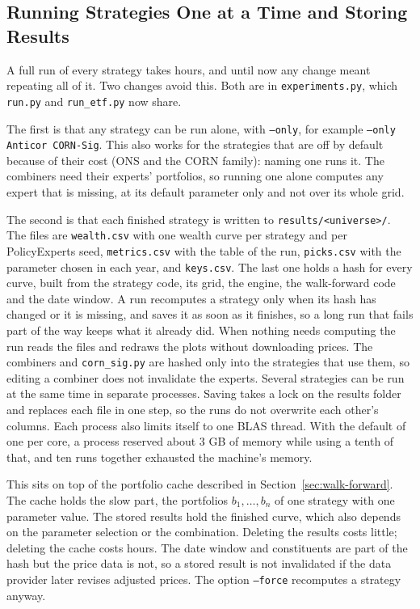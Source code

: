 \documentclass[11pt]{article}
\begin{document}
\subsection{Running Strategies One at a Time and Storing Results}
\label{sec:storing}

A full run of every strategy takes hours, and until now any change meant
repeating all of it. Two changes avoid this. Both are in
\texttt{experiments.py}, which \texttt{run.py} and \texttt{run\_etf.py}
now share.

The first is that any strategy can be run alone, with
\texttt{--only}, for example \texttt{--only Anticor CORN-Sig}. This also
works for the strategies that are off by default because of their cost
(ONS and the CORN family): naming one runs it. The combiners need their
experts' portfolios, so running one alone computes any expert that is
missing, at its default parameter only and not over its whole grid.

The second is that each finished strategy is written to
\texttt{results/<universe>/}. The files are \texttt{wealth.csv} with one
wealth curve per strategy and per PolicyExperts seed,
\texttt{metrics.csv} with the table of the run, \texttt{picks.csv} with
the parameter chosen in each year, and \texttt{keys.csv}. The last one holds
a hash for every curve, built from the strategy code, its grid, the
engine, the walk-forward code and the date window. A run recomputes a
strategy only when its hash has changed or it is missing, and saves it as
soon as it finishes, so a long run that fails part of the way keeps what
it already did. When nothing needs computing the run reads the files and
redraws the plots without downloading prices. The combiners and
\texttt{corn\_sig.py} are hashed only into the strategies that use them,
so editing a combiner does not invalidate the experts. Several strategies
can be run at the same time in separate processes. Saving takes a lock on
the results folder and replaces each file in one step, so the runs do not
overwrite each other's columns. Each process also limits itself to one BLAS
thread. With the default of one per core, a process reserved about 3 GB of
memory while using a tenth of that, and ten runs together exhausted the
machine's memory.

This sits on top of the portfolio cache described in
Section~\ref{sec:walk-forward}. The cache holds the slow part, the
portfolios $b_1, \dots, b_n$ of one strategy with one parameter value. The
stored results hold the finished curve, which also depends on the
parameter selection or the combination. Deleting the results costs
little; deleting the cache costs hours. The date window and constituents
are part of the hash but the price data is not, so a stored result is not
invalidated if the data provider later revises adjusted prices. The
option \texttt{--force} recomputes a strategy anyway.
\end{document}
